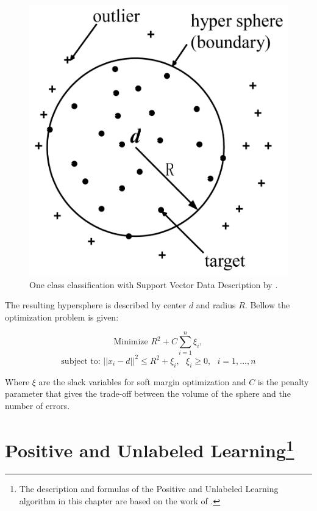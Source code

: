 \begin{figure}[h!]
    \centering
    \includegraphics[scale=0.2]{Graphics/tax-duin-svm.png}
    \caption{One class classification with Support Vector Data Description by \cite{Tax:2004:SVD:960091.960109}.}
    \label{fig:hypersphere}
\end{figure}

The resulting hypersphere is described by center \(d\) and radius
\(R\). Bellow the optimization problem is given: 

\[ \textrm{Minimize } R^2 + C \sum_{i=1}^{n} \xi_i, \]
\[ \textrm{subject to: } || x_i - d ||^2 \leq R^2 + \xi_i, \textrm{ } \xi_i \geq 0, \textrm{ } i = 1, ..., n \]

Where \( \xi \) are the slack variables for soft margin optimization and \( C \)  is the penalty parameter that gives the trade-off between the volume of the sphere and the number of errors.

\section[Positive and Unlabeled Learning]{Positive and Unlabeled Learning\footnote{The description and formulas of the Positive and Unlabeled Learning algorithm in this chapter are based on the work of \cite{Elkan;Noto:2008}.}}\label{Chapter:PUL}


